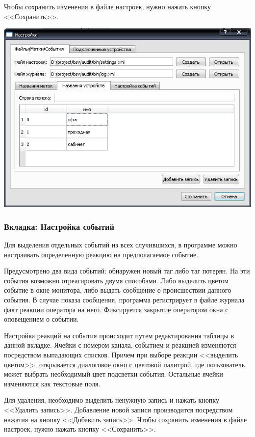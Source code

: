 Чтобы сохранить изменения в файле настроек, нужно нажать кнопку <<Сохранить>>.

\begin{center}
    \includegraphics[scale=0.5]{img/settings_dev_name.png}
\end{center}

\subsubsection{Вкладка: Настройка событий}

Для выделения отдельных событий из всех случившихся, в программе можно настраивать определенную реакцию
на предполагаемое событие. 

Предусмотрено два вида событий: обнаружен новый таг либо таг потерян. На эти события возможно отреагировать двумя способами.
Либо выделить цветом событие в окне монитора, либо выдать сообщение о происшествии данного события.
В случае показа сообщения, программа регистрирует в файле журнала факт реакции оператора на него. Фиксируется закрытие
оператором окна с оповещением о событии.

Настройка реакций на события происходит путем редактирования таблицы в данной вкладке. Ячейки с номером канала, событием и реакцией
изменяются посредством выпадающих списков. Причем при выборе реакции <<выделить цветом>>, открывается диалоговое окно с цветовой палитрой, где
пользователь может выбрать необходимый цвет подсветки события. Остальные ячейки изменяются как текстовые поля. 

Для удаления, необходимо выделить ненужную 
запись и нажать кнопку <<Удалить запись>>. Добавление новой записи производится посредством нажатия на
кнопку <<Добавить запись>>. 
Чтобы сохранить изменения в файле настроек, нужно нажать кнопку <<Сохранить>>.


